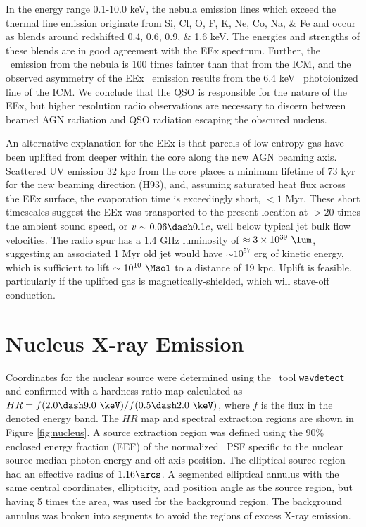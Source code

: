 \documentclass[useAMS,usenatbib]{mn2e}
\begin{document}
In the energy range 0.1-10.0 keV, the nebula emission lines which
exceed the thermal line emission originate from Si, Cl, O, F, K, Ne,
Co, Na, \& Fe and occur as blends around redshifted 0.4, 0.6, 0.9, \&
1.6 keV. The energies and strengths of these blends are in good
agreement with the EEx spectrum. Further, the \feka\ emission from the
nebula is 100 times fainter than that from the ICM, and the observed
asymmetry of the EEx \feka\ emission results from the 6.4 keV
\feka\ photoionized line of the ICM. We conclude that the QSO is
responsible for the nature of the EEx, but higher resolution radio
observations are necessary to discern between beamed AGN radiation and
QSO radiation escaping the obscured nucleus.

An alternative explanation for the EEx is that parcels of low entropy
gas have been uplifted from deeper within the core along the new AGN
beaming axis. Scattered UV emission 32 kpc from the core places a
minimum lifetime of 73 kyr for the new beaming direction (H93), and,
assuming saturated heat flux across the EEx surface, the evaporation
time is exceedingly short, $< 1$ Myr. These short timescales suggest
the EEx was transported to the present location at $> 20$ times the
ambient sound speed, or $v \sim 0.06 \dash 0.1c$, well below typical
jet bulk flow velocities. The radio spur has a 1.4 GHz luminosity of
$\approx 3 \times 10^{39} ~\lum$, suggesting an associated 1 Myr old
jet would have $\sim 10^{57}$ erg of kinetic energy, which is
sufficient to lift $\sim 10^{10} ~\Msol$ to a distance of 19
kpc. Uplift is feasible, particularly if the uplifted gas is
magnetically-shielded, which will stave-off conduction.

\section{Nucleus X-ray Emission}
\label{sec:centsrc}

Coordinates for the nuclear source were determined using the
\ciao\ tool {\tt wavdetect} and confirmed with a hardness ratio map
calculated as $HR = f(2.0 \dash 9.0 ~\keV) / f(0.5 \dash 2.0 ~\keV)$,
where $f$ is the flux in the denoted energy band. The $HR$ map and
spectral extraction regions are shown in Figure \ref{fig:nucleus}. A
source extraction region was defined using the 90\% enclosed energy
fraction (EEF) of the normalized \chandra\ PSF specific to the nuclear
source median photon energy and off-axis position. The elliptical
source region had an effective radius of $1.16\arcs$. A segmented
elliptical annulus with the same central coordinates, ellipticity, and
position angle as the source region, but having 5 times the area, was
used for the background region. The background annulus was broken into
segments to avoid the regions of excess X-ray emission.
\end{document}
